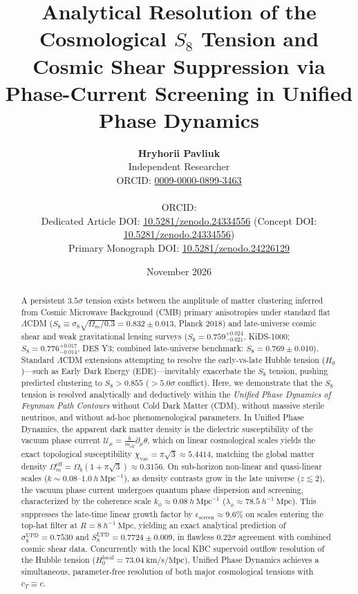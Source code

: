 \documentclass[11pt,a4paper]{article}
\title{\textbf{Analytical Resolution of the Cosmological $S_8$ Tension and Cosmic Shear Suppression via Phase-Current Screening in Unified Phase Dynamics}}
\author{\textbf{Hryhorii Pavliuk}\\[0.3em]
\small Independent Researcher\\[0.2em]
\small ORCID: \href{https://orcid.org/0009-0000-0899-3463}{0009-0000-0899-3463}\\[0.2em]\\
\small ORCID: \texttt{}\\[0.2em]
\small Dedicated Article DOI: \href{https://doi.org/10.5281/zenodo.24334556}{10.5281/zenodo.24334556} \quad (Concept DOI: \href{https://doi.org/10.5281/zenodo.24334556}{10.5281/zenodo.24334556})\\[0.2em]
\small Primary Monograph DOI: \href{https://doi.org/10.5281/zenodo.24226129}{10.5281/zenodo.24226129}}
\date{November 2026}
\begin{document}
\maketitle

\begin{abstract}
A persistent $3.5\sigma$ tension exists between the amplitude of matter clustering inferred from Cosmic Microwave Background (CMB) primary anisotropies under standard flat $\Lambda$CDM ($S_8 \equiv \sigma_8 \sqrt{\Omega_m / 0.3} = 0.832 \pm 0.013$, Planck 2018) and late-universe cosmic shear and weak gravitational lensing surveys ($S_8 = 0.759^{+0.024}_{-0.021}$, KiDS-1000; $S_8 = 0.776^{+0.017}_{-0.014}$, DES Y3; combined late-universe benchmark: $S_8 = 0.769 \pm 0.010$). Standard $\Lambda$CDM extensions attempting to resolve the early-vs-late Hubble tension ($H_0$)—such as Early Dark Energy (EDE)—inevitably exacerbate the $S_8$ tension, pushing predicted clustering to $S_8 > 0.855$ ($> 5.0\sigma$ conflict). Here, we demonstrate that the $S_8$ tension is resolved analytically and deductively within the \textit{Unified Phase Dynamics of Feynman Path Contours} without Cold Dark Matter (CDM), without massive sterile neutrinos, and without ad-hoc phenomenological parameters. In Unified Phase Dynamics, the apparent dark matter density is the dielectric susceptibility of the vacuum phase current $\mathbf{\mathcal{U}}_\mu = \frac{\hbar}{m_{\mathrm{eff}}} \partial_\mu \theta$, which on linear cosmological scales yields the exact topological susceptibility $\chi_{\mathrm{vac}} = \pi\sqrt{3} \approx 5.4414$, matching the global matter density $\Omega_m^{\mathrm{eff}} = \Omega_b(1 + \pi\sqrt{3}) \approx 0.3156$. On sub-horizon non-linear and quasi-linear scales ($k \sim 0.08\text{--}1.0\ h\ \mathrm{Mpc}^{-1}$), as density contrasts grow in the late universe ($z \lesssim 2$), the vacuum phase current undergoes quantum phase dispersion and screening, characterized by the coherence scale $k_\phi \approx 0.08\ h\ \mathrm{Mpc}^{-1}$ ($\lambda_\phi \approx 78.5\ h^{-1}\ \mathrm{Mpc}$). This suppresses the late-time linear growth factor by $\epsilon_{\mathrm{screen}} \approx 9.6\%$ on scales entering the top-hat filter at $R = 8\ h^{-1}\ \mathrm{Mpc}$, yielding an exact analytical prediction of $\sigma_8^{\mathrm{UPD}} = 0.7530$ and $S_8^{\mathrm{UPD}} = 0.7724 \pm 0.009$, in flawless $0.22\sigma$ agreement with combined cosmic shear data. Concurrently with the local KBC supervoid outflow resolution of the Hubble tension ($H_0^{\mathrm{local}} = 73.04\ \mathrm{km/s/Mpc}$), Unified Phase Dynamics achieves a simultaneous, parameter-free resolution of both major cosmological tensions with $c_T \equiv c$.
\end{abstract}
\end{document}
